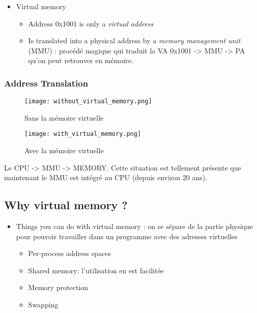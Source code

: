 \bigskip
\begin{itemize}
    \item Virtual memory
        \begin{itemize}
            \item Address 0x1001 is only a \textit{virtual address}
            \item Is translated into a physical address by a \textit{memory
                management unit} (MMU) : procédé magique qui traduit la
                VA 0x1001 -> MMU -> PA qu'on peut retrouver en mémoire.
        \end{itemize}
\end{itemize}
\bigskip

\subsubsection{Address Translation}

\begin{figure}[!ht]
    \texttt{[image: without\_virtual\_memory.png]}
    \caption{Sans la mémoire virtuelle}
\end{figure}

\begin{figure}[!ht]
    \texttt{[image: with\_virtual\_memory.png]}
    \caption{Avec la mémoire virtuelle}
\end{figure}

Le CPU -> MMU -> MEMORY. Cette situation est tellement présente que
maintenant le MMU est intégré au CPU (depuis environ 20 ans).

\subsection{Why virtual memory ?}

\begin{itemize}
    \item Things you can do with virtual memory : on se sépare de la
        partie physique pour pouvoir travailler dans un programme avec
        des adresses virtuelles
        \begin{itemize}
            \item Per-process address spaces
            \item Shared memory: l'utilisation en est facilitée
            \item Memory protection
            \item Swapping
        \end{itemize}
\end{itemize}
\bigskip

